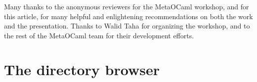 \documentclass{elsart}
\def\MOC{MetaOCaml\xspace}
\begin{document}
Many thanks to the anonymous reviewers for the \MOC workshop, and for
this article, for many helpful and enlightening recommendations on
both the work and the presentation.  Thanks to Walid Taha for
organizing the workshop, and to the rest of the \MOC team for their
development efforts.



\appendix
\section{The directory browser}
\label{sec:dir.meta}
\setcodefonts{11pt}{10pt}
\LGindent=8pt
\gdef\lgcommentstart{\end{lgrind}\vskip-3pt}
\def\lgcommentend{\vskip.5\baselineskip\begin{lgrind}}

\begin{lgrind}
\relax\end{lgrind}
\end{document}
